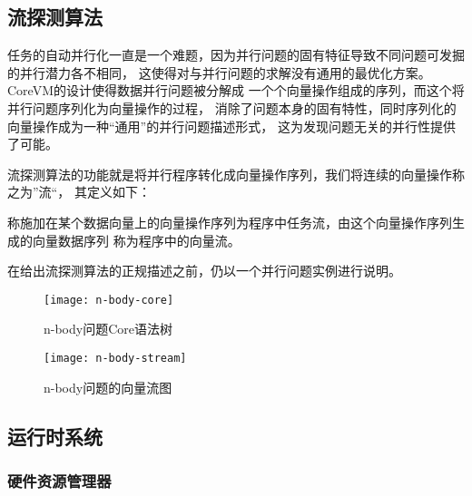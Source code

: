 \subsection{流探测算法}\label{subsec:stream-detection}
任务的自动并行化一直是一个难题，因为并行问题的固有特征导致不同问题可发掘的并行潜力各不相同，
这使得对与并行问题的求解没有通用的最优化方案。CoreVM的设计使得数据并行问题被分解成
一个个向量操作组成的序列，而这个将并行问题序列化为向量操作的过程，
消除了问题本身的固有特性，同时序列化的向量操作成为一种“通用”的并行问题描述形式，
这为发现问题无关的并行性提供了可能。

流探测算法的功能就是将并行程序转化成向量操作序列，我们将连续的向量操作称之为”流“，
其定义如下：
\begin{definition}
  称施加在某个数据向量上的向量操作序列为程序中任务流，由这个向量操作序列生成的向量数据序列
  称为程序中的向量流。
\end{definition}

在给出流探测算法的正规描述之前，仍以一个并行问题实例进行说明。
\begin{quotation}
\end{quotation}
\begin{figure}
  \centering
  \texttt{[image: n-body-core]}
  \caption{n-body问题Core语法树}
  \label{fig:n-body-core}
\end{figure}
\begin{figure}
  \centering
  \texttt{[image: n-body-stream]}
  \caption{n-body问题的向量流图}
  \label{fig:n-body--stream}
\end{figure}


\subsection{运行时系统}\label{subsec:runtime-system}
\subsubsection{硬件资源管理器}

